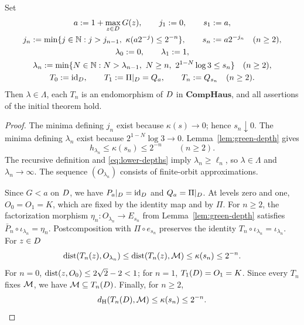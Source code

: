 \begin{theorem}
\label{thm:constructed-external-maps}
Set
\begin{gather}
 a:=1+\max_{z\in D}G(z),\qquad j_1:=0,\qquad s_1:=a,\notag\\
 j_n:=\min\{j\in\mathbb N:j>j_{n-1},\
                       \kappa(a2^{-j})\le2^{-n}\},\qquad
 s_n:=a2^{-j_n}\quad(n\ge2),\label{eq:height-choice}\\
 \lambda_0:=0,\qquad\lambda_1:=1,\notag\\
 \lambda_n:=\min\{N\in\mathbb N:N>\lambda_{n-1},\
                N\ge n,\ 2^{1-N}\log3\le s_n\}\quad(n\ge2),
 \label{eq:external-depths}\\
 T_0:=\operatorname{id}_{D},\qquad T_1:=\Pi|_{D}=Q_a,\qquad
 T_n:=Q_{s_n}\quad(n\ge2).\label{eq:external-maps}
\end{gather}
Then \(\lambda\in\Lambda\), each \(T_n\) is an endomorphism of
\(D\) in \(\mathbf{CompHaus}\), and all assertions of the initial
theorem hold.
\end{theorem}
\begin{proof}
The minima defining \(j_n\) exist because \(\kappa(s)\to0\); hence
\(s_n\downarrow0\). The minima defining \(\lambda_n\) exist because
\(2^{1-N}\log3\to0\). Lemma~\ref{lem:green-depth} gives
\begin{equation}
 h_{\lambda_n}\le\kappa(s_n)\le2^{-n}\qquad(n\ge2).
 \label{eq:external-mesh-bound}
\end{equation}
The recursive definition and \eqref{eq:lower-depths} imply
\(\lambda_n\ge\ell_n\), so \(\lambda\in\Lambda\) and
\(\lambda_n\to\infty\). The sequence \((O_{\lambda_n})\) consists of
finite-orbit approximations.

Since \(G<a\) on \(D\), we have \(P_a|_{D}=\operatorname{id}_{D}\) and
\(Q_a=\Pi|_{D}\). At levels zero and one, \(O_0=O_1=K\), which are
fixed by the identity map and by \(\Pi\). For \(n\ge2\), the
factorization morphism \(\eta_n:O_{\lambda_n}\to E_{s_n}\) from
Lemma~\ref{lem:green-depth} satisfies
\(\bar P_n\circ\iota_{\lambda_n}=\eta_n\). Postcomposition with
\(\Pi\circ e_{s_n}\) preserves the identity
\(T_n\circ\iota_{\lambda_n}=\iota_{\lambda_n}\).
For \(z\in D\)
\[
 \operatorname{dist}(T_n(z),O_{\lambda_n})
 \le\operatorname{dist}(T_n(z),\mathcal M)
 \le\kappa(s_n)\le2^{-n}.
\]
For \(n=0\), \(\operatorname{dist}(z,O_0)\le2\sqrt2-2<1\); for \(n=1\),
\(T_1(D)=O_1=K\). Since every \(T_n\) fixes \(\mathcal M\), we have
\(\mathcal M\subseteq T_n(D)\).
Finally, for \(n\ge2\),
\[
 d_{\mathrm H}(T_n(D),\mathcal M)\le\kappa(s_n)\le2^{-n}.
\]
\end{proof}

